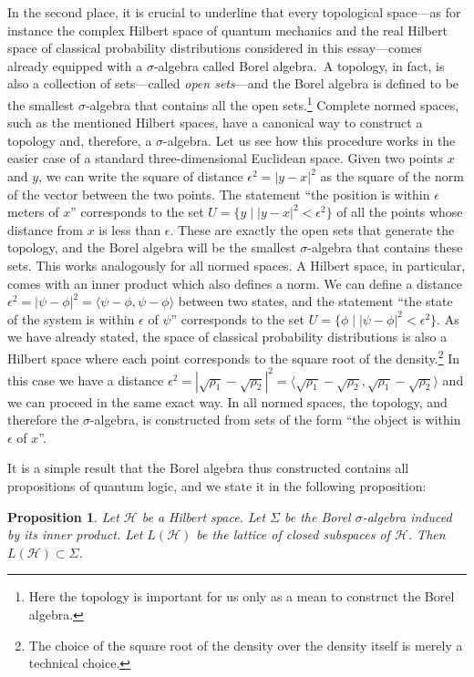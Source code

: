 \documentclass[11pt, executivepaper]{article}
\newtheorem{prop}{Proposition}
\begin{document}
In the second place, it is crucial to underline that every topological space---as for instance the complex Hilbert space of quantum mechanics and the real Hilbert space of classical probability distributions considered in this essay---comes already equipped with a $\sigma$-algebra called Borel algebra.\ A topology, in fact, is also a collection of sets---called \emph{open sets}---and the Borel algebra is defined to be the smallest $\sigma$-algebra that contains all the open sets.\footnote{Here the topology is important for us only as a mean to construct the Borel algebra.} Complete normed spaces, such as the mentioned Hilbert spaces, have a canonical way to construct a topology and, therefore, a $\sigma$-algebra. Let us see how this procedure works in the easier case of a standard three-dimensional Euclidean space. Given two points $x$ and $y$, we can write the square of distance $\epsilon^2 = |y - x|^2$ as the square of the norm of the vector between the two points. The statement ``the position is within $\epsilon$ meters of $x$'' corresponds to the set $U = \{y \; | \; |y - x|^2 < \epsilon^2 \}$ of all the points whose distance from $x$ is less than $\epsilon$. These are exactly the open sets that generate the topology, and the Borel algebra will be the smallest $\sigma$-algebra that contains these sets. This works analogously for all normed spaces. A Hilbert space, in particular, comes with an inner product which also defines a norm. We can define a distance $\epsilon^2 = |\psi - \phi|^2=\langle \psi - \phi , \psi - \phi \rangle$ between two states, and the statement ``the state of the system is within $\epsilon$ of $\psi$'' corresponds to the set $U = \{\phi \; | \; |\psi - \phi|^2 < \epsilon^2\}$. As we have already stated, the space of classical probability distributions is also a Hilbert space where each point corresponds to the square root of the density.\footnote{The choice of the square root of the density over the density itself is merely a technical choice.} In this case we have a distance $\epsilon^2 = |\sqrt{\rho_1} - \sqrt{\rho_2}|^2=\langle \sqrt{\rho_1} - \sqrt{\rho_2} , \sqrt{\rho_1} - \sqrt{\rho_2} \rangle$ and we can proceed in the same exact way. In all normed spaces, the topology, and therefore the $\sigma$-algebra, is constructed from sets of the form ``the object is within $\epsilon$ of $x$''.

It is a simple result that the Borel algebra thus constructed contains all propositions of quantum logic, and we state it in the following proposition:

\begin{prop}
	Let $\mathcal{H}$ be a Hilbert space. Let $\Sigma$ be the Borel $\sigma$-algebra induced by its inner product. Let $L(\mathcal{H})$ be the lattice of closed subspaces of $\mathcal{H}$. Then $L(\mathcal{H}) \subset \Sigma$.
\end{prop}
\end{document}
